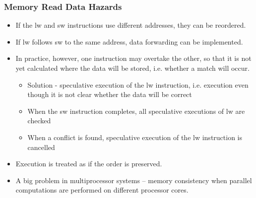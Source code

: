 \documentclass[aspectratio=169]{beamer}
\begin{document}
\begin{frame}
\frametitle{Memory Read Data Hazards}

\begin{itemize}
\item If the lw and sw instructions use different addresses, they can be reordered.
\item If lw follows sw to the same address, data forwarding can be implemented.
\item In practice, however, one instruction may overtake the other, so that it is not yet calculated where the data will be stored, i.e. whether a match will occur.
\begin{itemize}
\item Solution - speculative execution of the lw instruction, i.e. execution even though it is not clear whether the data will be correct
\item When the sw instruction completes, all speculative executions of lw are checked
\item When a conflict is found, speculative execution of the lw instruction is cancelled
\end{itemize}
\item Execution is treated as if the order is preserved.
\item A big problem in multiprocessor systems -- memory consistency when parallel computations are performed on different processor cores.
\end{itemize}

\end{frame}
\end{document}

